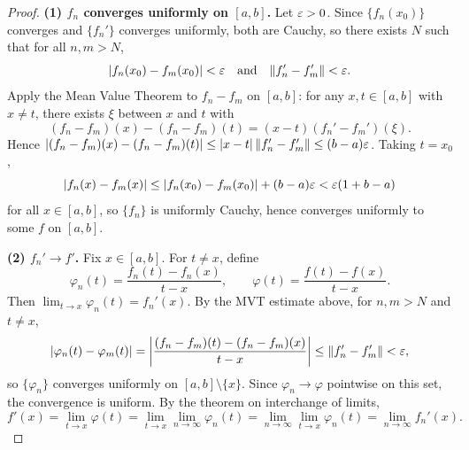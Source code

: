 \documentclass[../master/master.tex]{subfiles}
\begin{document}
\begin{proof}
\textbf{(1) $f_n$ converges uniformly on $[a,b]$.} Let $\varepsilon > 0$. Since $\{f_n(x_0)\}$ converges and $\{f_n'\}$ converges uniformly, both are Cauchy, so there exists $N$ such that for all $n, m > N$,
\[
|f_n(x_0) - f_m(x_0)| < \varepsilon \quad \text{and} \quad \|f_n' - f_m'\| < \varepsilon.
\]
Apply the Mean Value Theorem to $f_n - f_m$ on $[a,b]$: for any $x, t \in [a,b]$ with $x \neq t$, there exists $\xi$ between $x$ and $t$ with
\[
(f_n - f_m)(x) - (f_n - f_m)(t) = (x - t)(f_n' - f_m')(\xi).
\]
Hence $|(f_n - f_m)(x) - (f_n - f_m)(t)| \leq |x - t|\,\|f_n' - f_m'\| \leq (b - a)\varepsilon$. Taking $t = x_0$,
\[
|f_n(x) - f_m(x)| \leq |f_n(x_0) - f_m(x_0)| + (b-a)\varepsilon < \varepsilon(1 + b - a)
\]
for all $x \in [a,b]$, so $\{f_n\}$ is uniformly Cauchy, hence converges uniformly to some $f$ on $[a,b]$.

\textbf{(2) $f_n' \to f'$.} Fix $x \in [a,b]$. For $t \neq x$, define
\[
\varphi_n(t) = \frac{f_n(t) - f_n(x)}{t - x}, \qquad \varphi(t) = \frac{f(t) - f(x)}{t - x}.
\]
Then $\lim_{t \to x} \varphi_n(t) = f_n'(x)$. By the MVT estimate above, for $n, m > N$ and $t \neq x$,
\[
|\varphi_n(t) - \varphi_m(t)| = \left| \frac{(f_n - f_m)(t) - (f_n - f_m)(x)}{t - x} \right| \leq \|f_n' - f_m'\| < \varepsilon,
\]
so $\{\varphi_n\}$ converges uniformly on $[a,b] \setminus \{x\}$. Since $\varphi_n \to \varphi$ pointwise on this set, the convergence is uniform. By the theorem on interchange of limits,
\[
f'(x) = \lim_{t \to x} \varphi(t) = \lim_{t \to x} \lim_{n \to \infty} \varphi_n(t) = \lim_{n \to \infty} \lim_{t \to x} \varphi_n(t) = \lim_{n \to \infty} f_n'(x).
\]
\end{proof}
\end{document}
